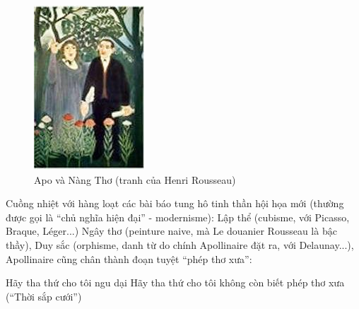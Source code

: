 \documentclass[../main.tex]{subfiles}
\begin{document}
\begin{multicols}{2}
 \begin{figure}
	\centering
	\includegraphics[width=\textwidth]{../img/tho070808_3.jpg}
	\caption{Apo và Nàng Thơ (tranh của Henri Rousseau)}
\end{figure}
 Cuồng nhiệt với hàng loạt các bài báo tung hô tinh thần hội họa mới (thường được gọi là “chủ nghĩa hiện đại” - modernisme): Lập thể (cubisme, với Picasso, Braque, Léger...) Ngây thơ (peinture naive, mà Le douanier Rousseau là bậc thầy), Duy sắc (orphisme, danh từ do chính Apollinaire đặt ra, với Delaunay...), Apollinaire cũng chân thành đoạn tuyệt “phép thơ xưa”: 
\begin{blockquote}
        
Hãy tha thứ cho tôi ngu dại        
Hãy tha thứ cho tôi không còn biết phép thơ xưa 
	(“Thời sắp cưới”) 


\end{blockquote}
\end{multicols}
\end{document}
